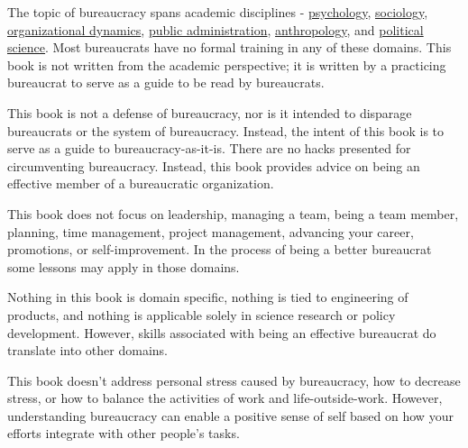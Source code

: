 The topic of bureaucracy spans academic disciplines - \href{https://en.wikipedia.org/wiki/Psychology}{psychology},
\href{https://en.wikipedia.org/wiki/Sociology}{sociology},
\href{https://en.wikipedia.org/wiki/Organizational_behavior}{organizational dynamics},
\href{https://en.wikipedia.org/wiki/Public_administration}{public administration}, 
\href{https://en.wikipedia.org/wiki/Anthropology}{anthropology},
and  
\href{https://en.wikipedia.org/wiki/Political_science}{political science}. 
Most bureaucrats have no formal training in any of these domains. This book is not written from the academic perspective; it is written by a practicing bureaucrat to serve as a guide to be read by bureaucrats. 

This book is not a defense of bureaucracy, nor is it intended to disparage bureaucrats or the system of bureaucracy. Instead, the intent of this book is to serve as a guide to bureaucracy-as-it-is. There are no hacks presented for circumventing bureaucracy. Instead, this book provides advice on being an effective member of a bureaucratic organization.

This book does not focus on leadership, managing a team, being a team member, planning, time management, project management, advancing your career, promotions, or self-improvement. In the process of being a better bureaucrat some lessons may apply in those domains.


Nothing in this book is domain specific, nothing is tied to engineering of products, and nothing is applicable solely in science research or policy development. However, skills associated with being an effective bureaucrat do translate into other domains.

This book doesn't address personal stress caused by bureaucracy, how to decrease stress, or how to balance the activities of work and life-outside-work.   However, understanding bureaucracy can enable a positive sense of self based on how your efforts integrate with other people's tasks. 

